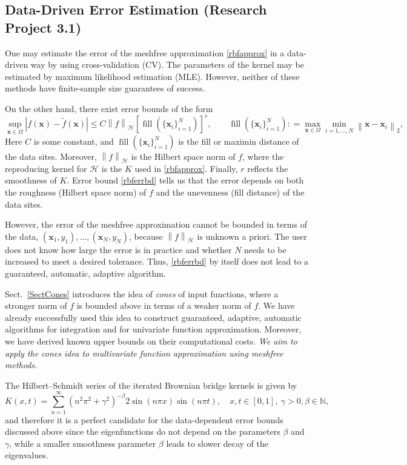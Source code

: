 \documentclass[11pt]{NSFamsart}
\newcommand{\tf}{\tilde{f}}
\newcommand{\bx}{{\boldsymbol{x}}}
\newcommand{\cx}{{\Omega}}
\def\abs#1{\ensuremath{\left \lvert #1 \right \rvert}}
\newcommand{\norm}[2][{}]{\ensuremath{\left \lVert #2 \right \rVert}_{#1}}
\DeclareMathOperator{\filldis}{fill}
\newcommand{\desn}{\{\bx_i\}_{i=1}^N}
\newcommand{\ch}{\mathcal{H}}
\begin{document}
\subsection{Data-Driven Error Estimation (Research Project 3.1)} One may estimate the error of the meshfree approximation \eqref{rbfapprox} in a data-driven way by using cross-validation (CV).  The parameters of the kernel may be estimated by maximum likelihood estimation (MLE).  However, neither of these methods have finite-sample size guarantees of success.

On the other hand, there exist error bounds of the form \citep{Wen05a}
\begin{equation} \label{rbferrbd}
\sup_{\bx \in \cx} \abs{f(\bx) - \tf(\bx)} \le C \norm[\ch]{f} [\filldis(\desn)]^r, \qquad \filldis(\desn): = \max_{\bx \in \cx} \min_{i=1,  \ldots, N} \norm[2]{\bx - \bx_i},
\end{equation}
Here $C$ is some constant, and $\filldis(\{\bx_i\}_{i=1}^N)$ is the fill or maximin distance of the data sites.  Moreover, $\norm[\ch]{f}$ is the Hilbert space norm of $f$, where the reproducing kernel for $\ch$ is the $K$ used in \eqref{rbfapprox}. Finally, $r$ reflects the smoothness of $K$.  Error bound \eqref{rbferrbd} tells us that the error depends on both the roughness (Hilbert space norm) of $f$ and the unevenness (fill distance) of the data sites.

However, the error of the meshfree approximation cannot be bounded in terms of the data, $(\bx_1, y_1), \ldots, (\bx_N,y_N)$, because $\norm[\ch]{f}$ is unknown a priori.  The user does not know how large the error is in practice and whether $N$ needs to be increased to meet a desired tolerance. Thus, \eqref{rbferrbd} by itself does not lead to a guaranteed, automatic, adaptive algorithm.

Sect.\ \ref{SectCones} introduces the idea of \emph{cones} of input functions, where a stronger norm of $f$ is bounded above in terms of a weaker norm of $f$.  We have already successfully used this idea to construct guaranteed, adaptive, automatic algorithms for integration and for univariate function approximation.  Moreover, we have derived known upper bounds on their computational costs. \emph{We aim to apply the cones idea to multivariate function approximation using meshfree methods.}

The Hilbert--Schmidt series of the iterated Brownian bridge kernels \citep{CavorettoEtAl14} is given by
\begin{equation}\label{IBBkernel}
K(x,t) = \sum_{n=1}^{\infty} \left(n^2\pi^2 + \gamma^2\right)^{-\beta} 2\sin(n\pi x) \sin(n\pi t), \quad x,t \in [0,1],\ \gamma>0, \beta \in \mathbb{N},
\end{equation}
and therefore it is a perfect candidate for the data-dependent error bounds discussed above since the eigenfunctions do not depend on the parameters $\beta$ and $\gamma$, while a smaller smoothness parameter $\beta$ leads to slower decay of the eigenvalues.
\end{document}
